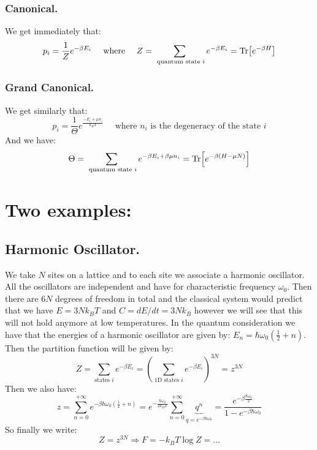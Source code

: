 \documentclass[10pt,a4paper]{book}
\begin{document}
\subsubsection{Canonical.}
We get immediately that:
\[
p_i = \frac{1}{Z} e^{-\beta E_i} \quad \text{ where } \quad Z = \sum_{ \text{ quantum state } i} e^{-\beta E_i} = \Tr[e^{-\beta H}]
\]
\subsubsection{Grand Canonical.}
We get similarly that:
\[
p_i = \frac{1}{\Theta} e^{\frac{-E_i + \mu n_i}{k_B T}} \quad \text{ where } n_i \text{ is the degeneracy of the state } i
\]
And we have:
\[
\Theta = \sum_{\text{ quantum state }i} e^{-\beta E_i + \beta \mu n_i} = \Tr[e^{-\beta(H - \mu N)}]
\]

\section{Two examples:}
\subsection{Harmonic Oscillator.}
We take $N$ sites on a lattice and to each site we associate a harmonic oscillator. All the oscillators are independent and have for characteristic frequency $\omega_0$. Then there are $6N$ degrees of freedom in total and the classical system would predict that we have $E = 3Nk_B T$ and $C = dE/dt = 3Nk_B$ however we will see that this will not hold anymore at low temperatures. In the quantum consideration we have that the energies of a harmonic oscillator are given by: $E_n = \hbar \omega_0 (\frac{1}{2} + n)$. Then the partition function will be given by:
\[
Z = \sum_{\text{states } i} e^{-\beta E_i} = \left(\sum_{\text{1D states } i} e^{-\beta E_i}\right)^{3N}=z^{3N}
\] 
Then we also have:
\[
z = \sum_{n = 0}^{+\infty} e^{-\beta \hbar \omega_0(\frac{1}{2} + n)} = e^{-\frac{\hbar \omega_0}{2 k_B T}} \sum_{n = 0}^{+\infty} \underbrace{q^n}_{q = e^{-\beta \hbar\omega_0}} = \frac{e^{-\beta \frac{\hbar \omega_0}{2}}}{1 - e^{-\beta \hbar \omega_0}}
\]
So finally we write:
\[
Z = z^{3N} \Rightarrow F = - k_B T \log Z=...
\]
\end{document}
